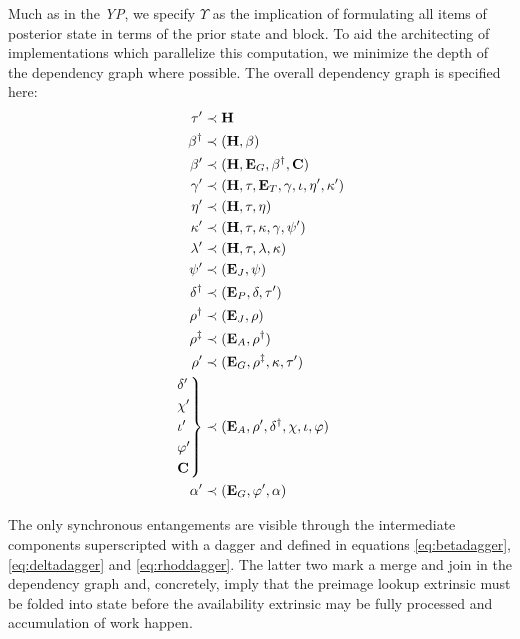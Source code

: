 Much as in the \emph{YP}, we specify $\Upsilon$ as the implication of formulating all items of posterior state in terms of the prior state and block. To aid the architecting of implementations which parallelize this computation, we minimize the depth of the dependency graph where possible. The overall dependency graph is specified here:
\begin{align}\label{eq:transitionfunctioncomposition}
  \tau' &\prec \mathbf{H} \\
  \beta^\dagger &\prec (\mathbf{H}, \beta) \label{eq:betadagger} \\
  \beta' &\prec (\mathbf{H}, \mathbf{E}_G, \beta^\dagger, \mathbf{C}) \\
  \gamma' &\prec (\mathbf{H}, \tau, \mathbf{E}_T, \gamma, \iota, \eta', \kappa') \\
  \eta' &\prec (\mathbf{H}, \tau, \eta) \\
  \kappa' &\prec (\mathbf{H}, \tau, \kappa, \gamma, \psi') \\
  \lambda' &\prec (\mathbf{H}, \tau, \lambda, \kappa) \\
  \psi' &\prec (\mathbf{E}_J, \psi) \\
  \delta^\dagger &\prec (\mathbf{E}_P, \delta, \tau') \label{eq:deltadagger} \\
  \rho^\dagger &\prec (\mathbf{E}_J, \rho) \label{eq:rhodagger} \\
  \rho^\ddagger &\prec (\mathbf{E}_A, \rho^\dagger) \label{eq:rhoddagger} \\
  \rho' &\prec (\mathbf{E}_G, \rho^\ddagger, \kappa, \tau') \\
  \begin{rcases*}
    \delta' \\
    \chi' \\
    \iota' \\
    \varphi' \\
    \mathbf{C}
  \end{rcases*} &\prec (\mathbf{E}_A, \rho', \delta^\dagger, \chi, \iota, \varphi) \\
  \alpha' &\prec (\mathbf{E}_G, \varphi', \alpha)
\end{align}

The only synchronous entangements are visible through the intermediate components superscripted with a dagger and defined in equations \ref{eq:betadagger}, \ref{eq:deltadagger} and \ref{eq:rhoddagger}. The latter two mark a merge and join in the dependency graph and, concretely, imply that the preimage lookup extrinsic must be folded into state before the availability extrinsic may be fully processed and accumulation of work happen.

